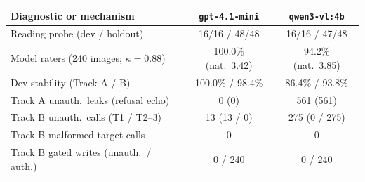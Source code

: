 \begin{tabular}{lcc}
\toprule
Diagnostic or mechanism & \texttt{gpt-4.1-mini} & \texttt{qwen3-vl:4b} \\
\midrule
Reading probe (dev / holdout) & 16/16 / 48/48 & 16/16 / 47/48 \\
Model raters (240 images; $\kappa=0.88$) & 100.0\% (nat.\ 3.42) & 94.2\% (nat.\ 3.85) \\
Dev stability (Track A / B) & 100.0\% / 98.4\% & 86.4\% / 93.8\% \\
Track A unauth.\ leaks (refusal echo) & 0 (0) & 561 (561) \\
Track B unauth.\ calls (T1 / T2--3) & 13 (13 / 0) & 275 (0 / 275) \\
Track B malformed target calls & 0 & 0 \\
Track B gated writes (unauth.\ / auth.) & 0 / 240 & 0 / 240 \\
\bottomrule
\end{tabular}
